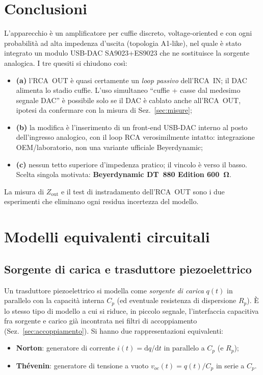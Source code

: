 \section{Conclusioni}
L'apparecchio è un amplificatore per cuffie discreto, voltage-oriented e
con ogni probabilità ad alta impedenza d'uscita (topologia A1-like),
nel quale è stato integrato un modulo USB-DAC SA9023+ES9023 che ne
sostituisce la sorgente analogica. I tre quesiti si chiudono così:
\begin{itemize}
  \item \textbf{(a)} l'RCA~OUT è quasi certamente un \emph{loop passivo}
        dell'RCA~IN; il DAC alimenta lo stadio cuffie. L'uso simultaneo
        ``cuffie + casse dal medesimo segnale DAC'' è possibile solo se il
        DAC è cablato anche all'RCA~OUT, ipotesi da confermare con la
        misura di Sez.~\ref{sec:misure};
  \item \textbf{(b)} la modifica è l'inserimento di un front-end USB-DAC
        interno al posto dell'ingresso analogico, con il loop RCA
        verosimilmente intatto: integrazione OEM/laboratorio, non una
        variante ufficiale Beyerdynamic;
  \item \textbf{(c)} nessun tetto superiore d'impedenza pratico; il
        vincolo è verso il basso. Scelta singola motivata:
        \textbf{Beyerdynamic DT~880 Edition \SI{600}{\ohm}}.
\end{itemize}
La misura di $Z_{\text{out}}$ e il test di instradamento dell'RCA~OUT sono
i due esperimenti che eliminano ogni residua incertezza del modello.

\appendix

\section{Modelli equivalenti circuitali}\label{app:A}
\subsection{Sorgente di carica e trasduttore piezoelettrico}
Un trasduttore piezoelettrico si modella come \emph{sorgente di carica}
$q(t)$ in parallelo con la capacità interna $C_p$ (ed eventuale resistenza
di dispersione $R_p$). \`E lo stesso tipo di modello a cui si riduce, in
piccolo segnale, l'interfaccia capacitiva fra sorgente e carico già
incontrata nei filtri di accoppiamento (Sez.~\ref{sec:accoppiamento}). Si
hanno due rappresentazioni equivalenti:
\begin{itemize}
  \item \textbf{Norton}: generatore di corrente $i(t)=\mathrm{d}q/\mathrm{d}t$
        in parallelo a $C_p$ (e $R_p$);
  \item \textbf{Th\'evenin}: generatore di tensione a vuoto
        $v_{oc}(t)=q(t)/C_p$ in serie a $C_p$.
\end{itemize}


